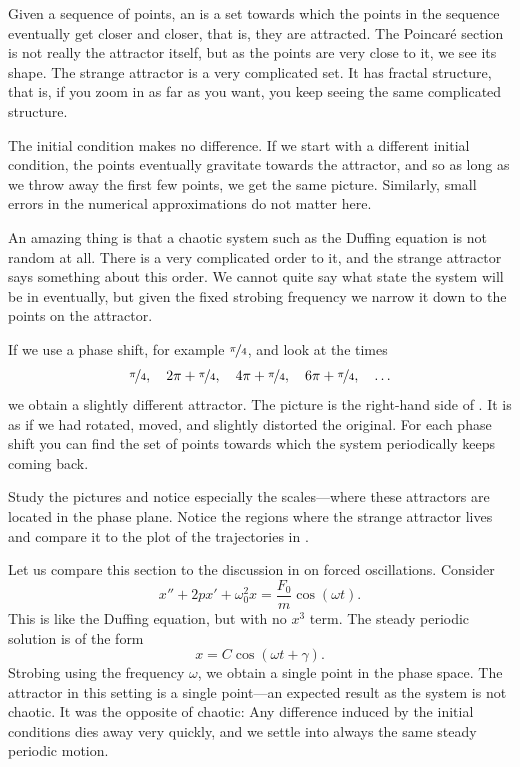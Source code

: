 Given a sequence of points, 
an \emph{} is a set towards which the points
in the sequence
eventually get closer and closer, that is, they are attracted.  The
Poincar\'e section is not really the attractor itself, but as
the points are very close to it, we see its shape.  The strange
attractor is a very complicated set.   It has
fractal structure, that is, if you zoom in as far as you want, you
keep seeing the same complicated structure.

The initial condition makes no difference.  If
we start with a different initial condition, the points eventually
gravitate towards the attractor, and so as long as we throw away the first
few points, we get the same picture.
Similarly, small errors in the numerical approximations do not matter here.

An amazing thing is that a chaotic system such as the Duffing equation is
not random at all.  There is a very complicated order to it, and the strange
attractor says something about this order.  We cannot quite say what state
the system will be in eventually, but given the fixed strobing frequency we
narrow it down to the points on the attractor.

If we use a phase shift, for example $\nicefrac{\pi}{4}$, and look at the
times
\begin{equation*}
\nicefrac{\pi}{4}, \quad
2\pi+\nicefrac{\pi}{4}, \quad
4\pi+\nicefrac{\pi}{4}, \quad
6\pi+\nicefrac{\pi}{4}, \quad
\ldots
\end{equation*}
we obtain a slightly different attractor.
The picture is the right-hand side of 
.
It is as if we had
rotated, moved, and slightly distorted the original.
For each phase shift you can find the
set of points towards which the system periodically keeps coming back.

Study the pictures and notice especially the scales---where
these attractors are located in the phase plane.  Notice the
regions where the strange attractor lives and compare it to the plot of the
trajectories in .

Let us
compare this section to the discussion in  on forced
oscillations.  Consider
\begin{equation*}
x''+2p x' + \omega_0^2 x = \frac{F_0}{m} \cos (\omega t) .
\end{equation*}
This is like the Duffing equation, but with no $x^3$ term.
The steady periodic solution is of the form
\begin{equation*}
x = C \cos (\omega t + \gamma) .
\end{equation*}
Strobing using the frequency $\omega$, we obtain a single point in the
phase space.  The attractor in this setting is a single point---an
expected result as the system is not chaotic.  It was the opposite
of chaotic:  Any difference induced by the initial conditions dies away very
quickly, and we settle into always the same steady periodic motion.

